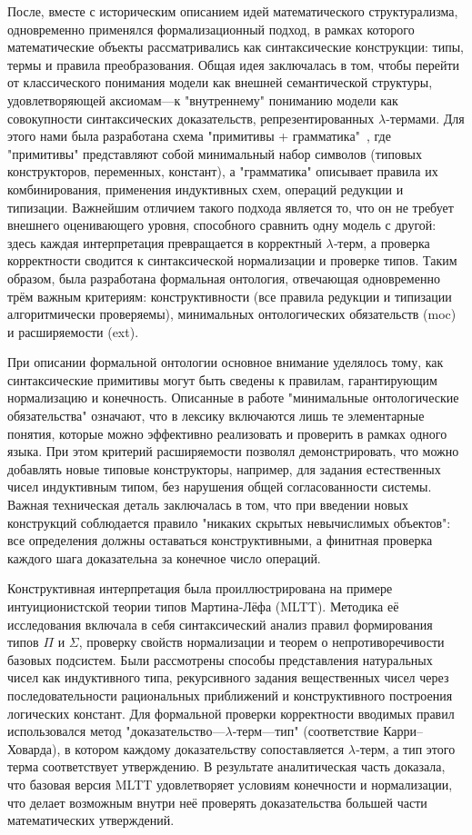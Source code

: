 \documentclass[14pt]{extarticle}
\begin{document}
	После, вместе с историческим описанием идей математического структурализма, одновременно применялся формализационный подход, в рамках которого математические объекты рассматривались как синтаксические конструкции: типы, термы и правила преобразования. Общая идея заключалась в том, чтобы перейти от классического понимания модели как внешней семантической структуры, удовлетворяющей аксиомам—к "внутреннему" пониманию модели как совокупности синтаксических доказательств, репрезентированных \(\lambda\)\nobreakdash‐термами. Для этого нами была разработана схема "примитивы + грамматика"\  , где "примитивы" представляют собой минимальный набор символов (типовых конструкторов, переменных, констант), а "грамматика" описывает правила их комбинирования, применения индуктивных схем, операций редукции и типизации. Важнейшим отличием такого подхода является то, что он не требует внешнего оценивающего уровня, способного сравнить одну модель с другой: здесь каждая интерпретация превращается в корректный \(\lambda\)‐терм, а проверка корректности сводится к синтаксической нормализации и проверке типов. Таким образом, была разработана формальная онтология, отвечающая одновременно трём важным критериям: конструктивности (все правила редукции и типизации алгоритмически проверяемы), минимальных онтологических обязательств (moc) и расширяемости (ext). 
	
	При описании формальной онтологии основное внимание уделялось тому, как синтаксические примитивы могут быть сведены к правилам, гарантирующим нормализацию и конечность. Описанные в работе "минимальные онтологические обязательства" означают, что в лексику включаются лишь те элементарные понятия, которые можно эффективно реализовать и проверить в рамках одного языка. При этом критерий расширяемости позволял демонстрировать, что можно добавлять новые типовые конструкторы, например, для задания естественных чисел индуктивным типом, без нарушения общей согласованности системы. Важная техническая деталь заключалась в том, что при введении новых конструкций соблюдается правило "никаких скрытых невычислимых объектов": все определения должны оставаться конструктивными, а финитная проверка каждого шага доказательна за конечное число операций.
	
	Конструктивная интерпретация была проиллюстрирована на примере интуиционистской теории типов Мартина‐Лёфа (MLTT). Методика её исследования включала в себя синтаксический анализ правил формирования типов $\Pi$ и $\Sigma$, проверку свойств нормализации и теорем о непротиворечивости базовых подсистем. Были рассмотрены способы представления натуральных чисел как индуктивного типа, рекурсивного задания вещественных чисел через последовательности рациональных приближений и конструктивного построения логических констант. Для формальной проверки корректности вводимых правил использовался метод "доказательство—\(\lambda\)‐терм—тип" (соответствие Карри–Ховарда), в котором каждому доказательству сопоставляется \(\lambda\)‐терм, а тип этого терма соответствует утверждению. В результате аналитическая часть доказала, что базовая версия MLTT удовлетворяет условиям конечности и нормализации, что делает возможным внутри неё проверять доказательства большей части математических утверждений.
	
\end{document}
